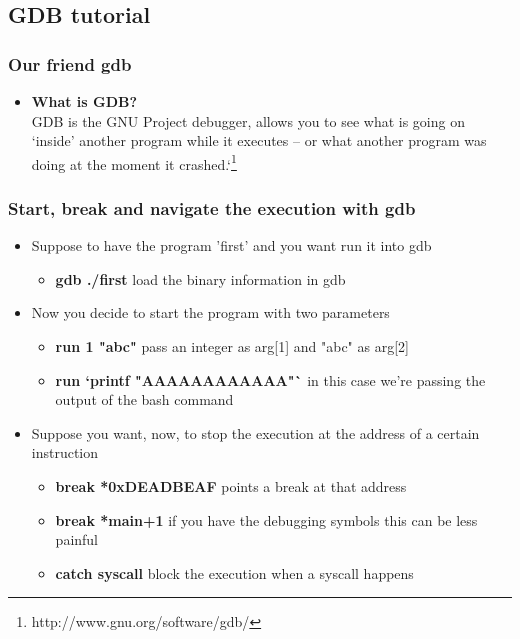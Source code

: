 \documentclass[]{beamer}
\begin{document}
\subsection{GDB tutorial}
\begin{frame}
  \frametitle{Our friend gdb}
  \begin{itemize}
  \item{{\bf What is GDB?}}\\
    GDB is the GNU Project debugger, allows you to see what is going on `inside' another program while it executes -- or what another program was doing at the moment it crashed.`\footnote{http://www.gnu.org/software/gdb/}
  \end{itemize}
\end{frame}
\begin{frame}
  \frametitle{Start, break and navigate the execution with gdb}
  \begin{itemize}
  \item{Suppose to have the program 'first' and you want run it into gdb }\\
    \begin{itemize}
    \item{{\bf gdb ./first} load the binary information in gdb}
    \end{itemize}
  \item{Now you decide to start the program with two parameters}\\
    \begin{itemize}
    \item{{\bf run 1 "abc"} pass an integer as arg[1] and "abc" as arg[2]}
    \item{{\bf run `printf "AAAAAAAAAAAA"`} in this case we're passing the output of the bash command}
    \end{itemize}
  \item{Suppose you want, now, to stop the execution at the address of a certain instruction}\\
    \begin{itemize}
    \item{{\bf break *0xDEADBEAF} points a break at that address}
    \item{{\bf break *main+1} if you have the debugging symbols this can be less painful}
    \item{{\bf catch syscall} block the execution when a syscall happens}
    \end{itemize}
  \end{itemize}
\end{frame}
\end{document}
